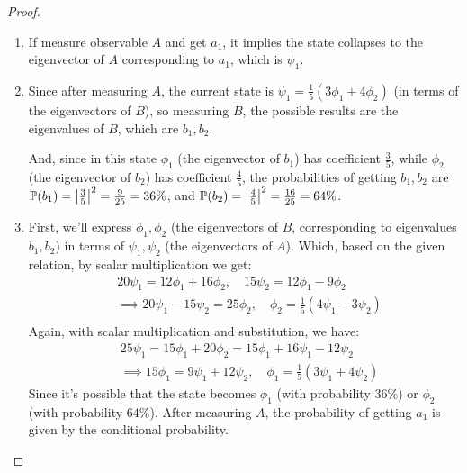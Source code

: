 \documentclass{article}
\begin{document}
\begin{proof}

    \hfil

    \begin{enumerate}
        \item If measure observable $A$ and get $a_1$, it implies the state collapses to the eigenvector of $A$ corresponding to $a_1$, which is $\psi_1$.
        
        \hfil

        \item Since after measuring $A$, the current state is $\psi_1=\frac{1}{5}(3\phi_1+4\phi_2)$ (in terms of the eigenvectors of $B$), so measuring $B$, the possible results are the eigenvalues of $B$, which are $b_1,b_2$. 
        
        And, since in this state $\phi_1$ (the eigenvector of $b_1$) has coefficient $\frac{3}{5}$, while $\phi_2$ (the eigenvector of $b_2$) has coefficient $\frac{4}{5}$, the probabilities of getting $b_1,b_2$ are $\mathbb{P}(b_1)=\left|\frac{3}{5}\right|^2 = \frac{9}{25} = 36\%$, and $\mathbb{P}(b_2)=\left|\frac{4}{5}\right|^2 = \frac{16}{25}=64\%$.

        \hfil

        \item First, we'll express $\phi_1,\phi_2$ (the eigenvectors of $B$, corresponding to eigenvalues $b_1,b_2$) in terms of $\psi_1,\psi_2$ (the eigenvectors of $A$). Which, based on the given relation, by scalar multiplication we get:
        \begin{align}
            &20\psi_1 = 12\phi_1 + 16\phi_2,\quad 15\psi_2 = 12\phi_1 - 9\phi_2\\
            &\implies 20\psi_1 - 15\psi_2 = 25\phi_2,\quad \phi_2 = \frac{1}{5}(4\psi_1 - 3\psi_2)\\
        \end{align}
        Again, with scalar multiplication and substitution, we have:
        \begin{align}
            &25\psi_1 = 15\phi_1 + 20\phi_2 = 15\phi_1+16\psi_1 - 12\psi_2\\
            &\implies 15\phi_1 = 9\psi_1 + 12\psi_2,\quad \phi_1 = \frac{1}{5}(3\psi_1+4\psi_2)
        \end{align}
        Since it's possible that the state becomes $\phi_1$ (with probability $36\%$) or $\phi_2$ (with probability $64\%$). After measuring $A$, the probability of getting $a_1$ is given by the conditional probability. 


\end{enumerate}
\end{proof}
\end{document}
